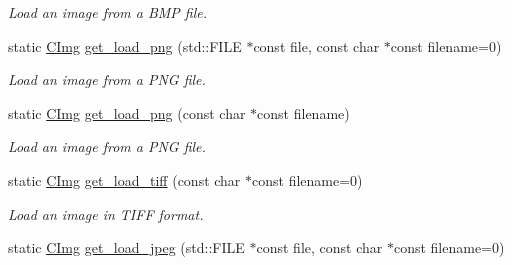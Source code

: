 \begin{DoxyCompactItemize}
\begin{DoxyCompactList}\small\item\em Load an image from a BMP file. \item\end{DoxyCompactList}\item 
\hypertarget{structcimg__library_1_1_c_img_ad812108bdb1d2a6928e509c9bc8c1c08}{
static \hyperlink{structcimg__library_1_1_c_img}{CImg} \hyperlink{structcimg__library_1_1_c_img_ad812108bdb1d2a6928e509c9bc8c1c08}{get\_\-load\_\-png} (std::FILE $\ast$const file, const char $\ast$const filename=0)}
\label{structcimg__library_1_1_c_img_ad812108bdb1d2a6928e509c9bc8c1c08}

\begin{DoxyCompactList}\small\item\em Load an image from a PNG file. \item\end{DoxyCompactList}\item 
\hypertarget{structcimg__library_1_1_c_img_a77fa8c53e85449f0eb7b923b515ad914}{
static \hyperlink{structcimg__library_1_1_c_img}{CImg} \hyperlink{structcimg__library_1_1_c_img_a77fa8c53e85449f0eb7b923b515ad914}{get\_\-load\_\-png} (const char $\ast$const filename)}
\label{structcimg__library_1_1_c_img_a77fa8c53e85449f0eb7b923b515ad914}

\begin{DoxyCompactList}\small\item\em Load an image from a PNG file. \item\end{DoxyCompactList}\item 
\hypertarget{structcimg__library_1_1_c_img_a1e4248a31fd83a0eb2349926acb7c239}{
static \hyperlink{structcimg__library_1_1_c_img}{CImg} \hyperlink{structcimg__library_1_1_c_img_a1e4248a31fd83a0eb2349926acb7c239}{get\_\-load\_\-tiff} (const char $\ast$const filename=0)}
\label{structcimg__library_1_1_c_img_a1e4248a31fd83a0eb2349926acb7c239}

\begin{DoxyCompactList}\small\item\em Load an image in TIFF format. \item\end{DoxyCompactList}\item 
\hypertarget{structcimg__library_1_1_c_img_a4582de9e3170ce981f33124eb3e5a93b}{
static \hyperlink{structcimg__library_1_1_c_img}{CImg} \hyperlink{structcimg__library_1_1_c_img_a4582de9e3170ce981f33124eb3e5a93b}{get\_\-load\_\-jpeg} (std::FILE $\ast$const file, const char $\ast$const filename=0)}
\label{structcimg__library_1_1_c_img_a4582de9e3170ce981f33124eb3e5a93b}


\end{DoxyCompactItemize}
